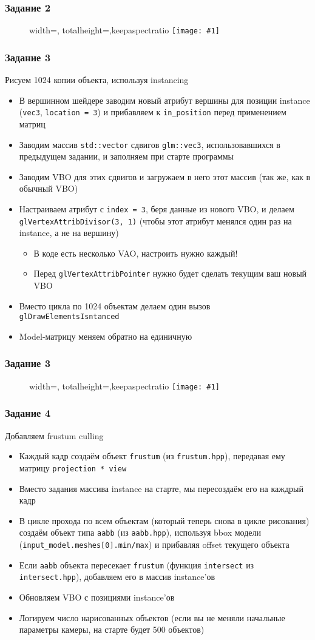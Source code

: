 \documentclass{beamer}
\newcommand{\slideimage}[1]{
  \begin{figure}
    \begin{adjustbox}{width=\textwidth, totalheight=\textheight-2\baselineskip-2\baselineskip,keepaspectratio}
      \texttt{[image: \#1]}
    \end{adjustbox}
  \end{figure}
}
\begin{document}
\begin{frame}
\frametitle{Задание 2}
\slideimage{2.png}
\end{frame}

\begin{frame}[fragile]
\fontsize{10pt}{10pt}
\selectfont
\frametitle{Задание 3}
Рисуем 1024 копии объекта, используя instancing
\begin{itemize}
\item В вершинном шейдере заводим новый атрибут вершины для позиции instance (\verb|vec3|, \verb|location = 3|) и прибавляем к \verb|in_position| перед применением матриц
\item Заводим массив \verb|std::vector| сдвигов \verb|glm::vec3|, использовавшихся в предыдущем задании, и заполняем при старте программы
\item Заводим VBO для этих сдвигов и загружаем в него этот массив (так же, как в обычный VBO)
\item Настраиваем атрибут с \verb|index = 3|, беря данные из нового VBO, и делаем \verb|glVertexAttribDivisor(3, 1)| (чтобы этот атрибут менялся один раз на instance, а не на вершину)
\begin{itemize}
\fontsize{10pt}{10pt}
\selectfont
\item В коде есть несколько VAO, настроить нужно каждый!
\item Перед \verb|glVertexAttribPointer| нужно будет сделать текущим ваш новый VBO
\end{itemize}
\item Вместо цикла по 1024 объектам делаем один вызов \verb|glDrawElementsIsntanced|
\item Model-матрицу меняем обратно на единичную
\end{itemize}
\end{frame}

\begin{frame}
\frametitle{Задание 3}
\slideimage{2.png}
\end{frame}

\begin{frame}[fragile]
\fontsize{10pt}{10pt}
\frametitle{Задание 4}
Добавляем frustum culling
\begin{itemize}
\item Каждый кадр создаём объект \verb|frustum| (из \verb|frustum.hpp|), передавая ему матрицу \verb|projection * view|
\item Вместо задания массива instance на старте, мы пересоздаём его на каждрый кадр
\item В цикле прохода по всем объектам (который теперь снова в цикле рисования) создаём объект типа \verb|aabb| (из \verb|aabb.hpp|), используя bbox модели (\verb|input_model.meshes[0].min/max|) и прибавляя offset текущего объекта
\item Если \verb|aabb| объекта пересекает \verb|frustum| (функция \verb|intersect| из \verb|intersect.hpp|), добавляем его в массив instance'ов
\item Обновляем VBO с позициями instance'ов
\item Логируем число нарисованных объектов (если вы не меняли начальные параметры камеры, на старте будет 500 объектов)
\end{itemize}
\end{frame}
\end{document}
